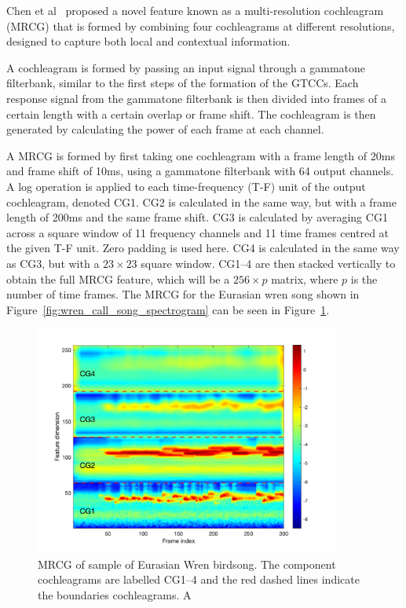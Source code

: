 Chen et al~\cite{chen2014feature} proposed a novel feature known as a
multi-resolution cochleagram (MRCG) that is formed by combining four
cochleagrams at different resolutions, designed to capture both local and
contextual information.

A cochleagram is formed by passing an input signal through a gammatone
filterbank, similar to the first steps of the formation of the GTCCs\@. Each
response signal from the gammatone filterbank is then divided into frames of a
certain length with a certain overlap or frame shift. The cochleagram is then
generated by calculating the power of each frame at each channel.

A MRCG is formed by first taking one cochleagram with a frame length of 20ms and
frame shift of 10ms, using a gammatone filterbank with 64 output channels. A log
operation is applied to each time-frequency (T-F) unit of the output
cochleagram, denoted CG1. CG2 is calculated in the same way, but with a frame
length of 200ms and the same frame shift. CG3 is calculated by averaging CG1
across a square window of 11 frequency channels and 11 time frames centred at
the given T-F unit. Zero padding is used here. CG4 is calculated in the same way
as CG3, but with a $23 \times 23$ square window. CG1--4 are then stacked
vertically to obtain the full MRCG feature, which will be a $256 \times p$
matrix, where $p$ is the number of time frames. The MRCG for the Eurasian wren
song shown in Figure~\ref{fig:wren_call_song_spectrogram} can be seen in
Figure~\ref{fig:mrcg_example}.

\begin{figure}[ht]
  \centering
  \includegraphics[width=0.9\textwidth]{figures/mrcg_example.png}
  \caption{MRCG of sample of Eurasian Wren birdsong. The component cochleagrams
  are labelled CG1--4 and the red dashed lines indicate the boundaries
cochleagrams. A}\label{fig:mrcg_example}
\end{figure}

